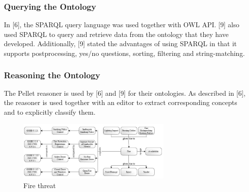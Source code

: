 \documentclass[conference, compsoc]{IEEEtran}
\begin{document}
\subsubsection{Querying the Ontology}
In [6], the SPARQL query language was used together with OWL API. [9] also used SPARQL to query and retrieve data from the ontology that they have developed. Additionally, [9] stated the advantages of using SPARQL in that it supports postprocessing, yes/no questions, sorting, filtering and string-matching. 

\subsubsection{Reasoning the Ontology}
The Pellet reasoner is used by [6] and [9] for their ontologies. As described in [6], the reasoner is used together with an editor to extract corresponding concepts and to explicitly classify them.

\begin{figure}[!t]
\centering
\includegraphics[width=3.0in]{fire-threat}
\caption{Fire threat}
\label{fire-threat}
\end{figure}
\end{document}
